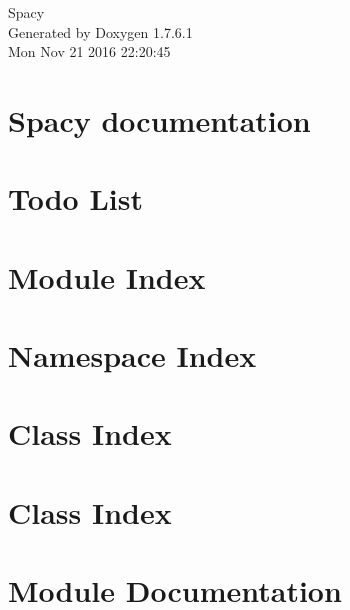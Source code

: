 \documentclass[a4paper]{book}
\begin{document}
\hypersetup{pageanchor=false,citecolor=blue}
\begin{titlepage}
\vspace*{7cm}
\begin{center}
{\Large \-Spacy }\\
\vspace*{1cm}
{\large \-Generated by Doxygen 1.7.6.1}\\
\vspace*{0.5cm}
{\small Mon Nov 21 2016 22:20:45}\\
\end{center}
\end{titlepage}
\clearemptydoublepage
{}
\tableofcontents
\clearemptydoublepage
{}
\hypersetup{pageanchor=true,citecolor=blue}
\chapter{\-Spacy documentation}
\label{index}\hypertarget{index}{}
\chapter{\-Todo \-List}
\label{todo}
\hypertarget{todo}{}

\chapter{\-Module \-Index}

\chapter{\-Namespace \-Index}

\chapter{\-Class \-Index}

\chapter{\-Class \-Index}

\chapter{\-Module \-Documentation}













\end{document}

